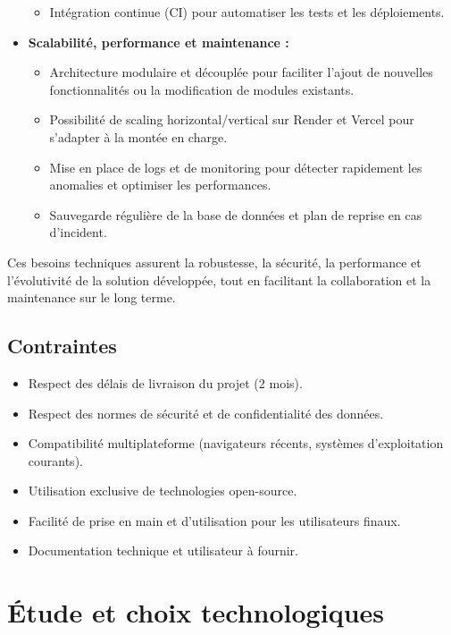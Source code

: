 \documentclass[12pt,a4paper]{report}
\begin{document}
\begin{itemize}
\begin{itemize}
        \item Intégration continue (CI) pour automatiser les tests et les déploiements.
    \end{itemize}
    \item \textbf{Scalabilité, performance et maintenance :}
    \begin{itemize}
        \item Architecture modulaire et découplée pour faciliter l’ajout de nouvelles fonctionnalités ou la modification de modules existants.
        \item Possibilité de scaling horizontal/vertical sur Render et Vercel pour s’adapter à la montée en charge.
        \item Mise en place de logs et de monitoring pour détecter rapidement les anomalies et optimiser les performances.
        \item Sauvegarde régulière de la base de données et plan de reprise en cas d’incident.
    \end{itemize}
\end{itemize}

Ces besoins techniques assurent la robustesse, la sécurité, la performance et l’évolutivité de la solution développée, tout en facilitant la collaboration et la maintenance sur le long terme.

\section{Contraintes}

\begin{itemize}
    \item Respect des délais de livraison du projet (2 mois).
    \item Respect des normes de sécurité et de confidentialité des données.
    \item Compatibilité multiplateforme (navigateurs récents, systèmes d’exploitation courants).
    \item Utilisation exclusive de technologies open-source.
    \item Facilité de prise en main et d’utilisation pour les utilisateurs finaux.
    \item Documentation technique et utilisateur à fournir.
\end{itemize}

\chapter{Étude et choix technologiques}
\end{document}

